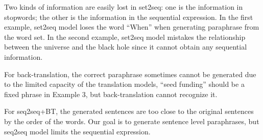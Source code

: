 Two kinds of information are easily lost in set2seq: 
one is the information in stopwords; the other is the information in the 
sequential expression. 
In the first example, set2seq model loses the word ``When'' 
when generating paraphrase from the word set. 
In the second example, set2seq model mistakes the relationship between the 
universe and the black hole since it cannot obtain any sequential information. 

For back-translation, the correct paraphrase sometimes cannot be 
generated due to the limited capacity of the translation models, 
``seed funding'' should be a fixed phrase in Example 3, 
but back-translation cannot recognize it.

For seq2seq+BT, the generated sentences are too close to the 
original sentences by the order of the words. 
Our goal is to generate sentence level paraphrases, 
but seq2seq model limits the sequential expression.

